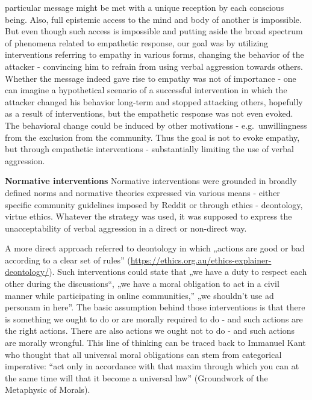\documentclass[
  10pt,
  dvipsnames,enabledeprecatedfontcommands]{scrartcl}
\begin{document}
particular message might be met with a unique reception by each
conscious being. Also, full epistemic access to the mind and body of
another is impossible. But even though such access is impossible and
putting aside the broad spectrum of phenomena related to empathetic
response, our goal was by utilizing interventions referring to empathy
in various forms, changing the behavior of the attacker - convincing him
to refrain from using verbal aggression towards others. Whether the
message indeed gave rise to empathy was not of importance - one can
imagine a hypothetical scenario of a successful intervention in which
the attacker changed his behavior long-term and stopped attacking
others, hopefully as a result of interventions, but the empathetic
response was not even evoked. The behavioral change could be induced by
other motivations - e.g.~unwillingness from the exclusion from the
community. Thus the goal is not to evoke empathy, but through empathetic
interventions - substantially limiting the use of verbal aggression.

\textbf{Normative interventions} Normative interventions were grounded
in broadly defined norms and normative theories expressed via various
means - either specific community guidelines imposed by Reddit or
through ethics - deontology, virtue ethics. Whatever the strategy was
used, it was supposed to express the unacceptability of verbal
aggression in a direct or non-direct way.

A more direct approach referred to deontology in which „actions are good
or bad according to a clear set of rules''
(\url{https://ethics.org.au/ethics-explainer-deontology/}). Such
interventions could state that „we have a duty to respect each other
during the discussions``, „we have a moral obligation to act in a civil
manner while participating in online communities,'' „we shouldn't use ad
personam in here''. The basic assumption behind those interventions is
that there is something we ought to do or are morally required to do -
and such actions are the right actions. There are also actions we ought
not to do - and such actions are morally wrongful. This line of thinking
can be traced back to Immanuel Kant who thought that all universal moral
obligations can stem from categorical imperative: ``act only in
accordance with that maxim through which you can at the same time will
that it become a universal law'' (Groundwork of the Metaphysic of
Morals).
\end{document}

